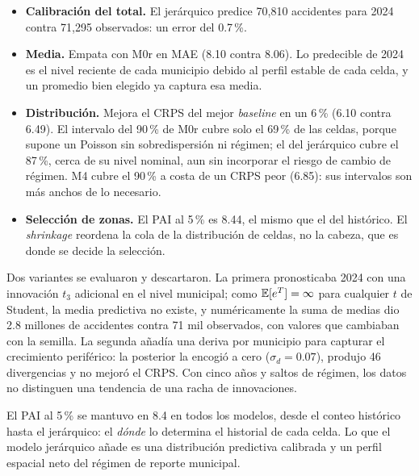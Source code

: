 \begin{itemize}
	\item \textbf{Calibración del total.} El jerárquico predice 70,810
	      accidentes para 2024 contra 71,295 observados: un error del 0.7\,\%.
	\item \textbf{Media.} Empata con M0r en MAE (8.10 contra 8.06). Lo
	      predecible de 2024 es el nivel reciente de cada municipio debido al perfil estable de cada celda, y un promedio bien elegido ya captura esa media.
	\item \textbf{Distribución.} Mejora el CRPS \parencite{gneiting2007strictly} del
	      mejor \emph{baseline} en un 6\,\% (6.10 contra 6.49). El intervalo del
	      90\,\% de M0r cubre solo el 69\,\% de las celdas, porque supone un Poisson
	      sin sobredispersión ni régimen; el del jerárquico cubre el 87\,\%, cerca de
	      su nivel nominal, aun sin incorporar el riesgo de cambio de régimen. M4
	      cubre el 90\,\% a costa de un CRPS peor (6.85): sus intervalos son más
	      anchos de lo necesario.
	\item \textbf{Selección de zonas.} El PAI al 5\,\% es 8.44, el
	      mismo que el del histórico. El \emph{shrinkage} reordena la cola de la
	      distribución de celdas, no la cabeza, que es donde se decide la selección.
\end{itemize}

Dos variantes se evaluaron y descartaron. La primera pronosticaba 2024 con
una innovación $t_3$ adicional en el nivel municipal; como
$\mathbb{E}[e^{T}] = \infty$ para cualquier $t$ de Student, la media predictiva no
existe, y numéricamente la suma de medias dio 2.8 millones de accidentes
contra 71 mil observados, con valores que cambiaban con la semilla. La
segunda añadía una deriva por municipio para capturar el crecimiento
periférico: la posterior la encogió a cero ($\sigma_d = 0.07$), produjo 46
divergencias y no mejoró el CRPS. Con cinco años y saltos de régimen, los
datos no distinguen una tendencia de una racha de innovaciones.

El PAI al 5\,\% se mantuvo en 8.4 en todos los modelos, desde el
conteo histórico hasta el jerárquico: el \emph{dónde} lo determina el
historial de cada celda. Lo que el modelo jerárquico añade es una
distribución predictiva calibrada y un perfil espacial neto del régimen de
reporte municipal.
